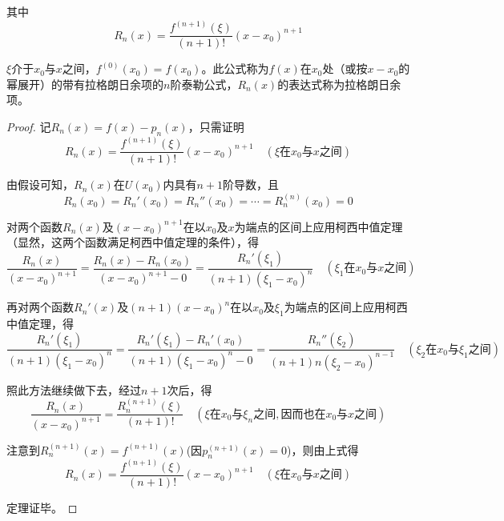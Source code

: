 其中
\begin{equation}
    R_n(x) = \dfrac{f^{(n+1)}(\xi)}{(n+1)!}(x-x_0)^{n+1}
    \nonumber
\end{equation}

$\xi$介于$x_0$与$x$之间，$f^{(0)}(x_0)=f(x_0)$。此公式称为$f(x)$在$x_0$处（或按$x-x_0$的幂展开）的带有拉格朗日余项的$n$阶泰勒公式，$R_n(x)$的表达式称为拉格朗日余项。

\begin{proof}
    记$R_n(x)=f(x)-p_n(x)$，只需证明
    \begin{equation}
        R_n(x) = \dfrac{f^{(n+1)}(\xi)}{(n+1)!}(x-x_0)^{n+1} \quad (\xi\mbox{在}x_0\mbox{与}x\mbox{之间})
        \nonumber
    \end{equation}

    由假设可知，$R_n(x)$在$U(x_0)$内具有$n+1$阶导数，且
    \begin{equation}
        R_n(x_0)=R_n'(x_0)=R_n''(x_0)=\cdots=R_n^{(n)}(x_0)=0
        \nonumber
    \end{equation}

    对两个函数$R_n(x)$及$(x-x_0)^{n+1}$在以$x_0$及$x$为端点的区间上应用柯西中值定理（显然，这两个函数满足柯西中值定理的条件），得
    \begin{equation}
        \dfrac{R_n(x)}{(x-x_0)^{n+1}}=\dfrac{R_n(x)-R_n(x_0)}{(x-x_0)^{n+1}-0}=
        \dfrac{R_n'(\xi_1)}{(n+1)(\xi_1-x_0)^n} \quad (\xi_1\mbox{在}x_0\mbox{与}x\mbox{之间})
        \nonumber
    \end{equation}

    再对两个函数$R_n'(x)$及$(n+1)(x-x_0)^n$在以$x_0$及$\xi_1$为端点的区间上应用柯西中值定理，得
    \begin{equation}
        \dfrac{R_n'(\xi_1)}{(n+1)(\xi_1-x_0)^n}=\dfrac{R_n'(\xi_1)-R_n'(x_0)}{(n+1)(\xi_1-x_0)^n -0}=
        \dfrac{R_n''(\xi_2)}{(n+1)n(\xi_2-x_0)^{n-1}} \quad (\xi_2\mbox{在}x_0\mbox{与}\xi_1\mbox{之间})
        \nonumber
    \end{equation}

    照此方法继续做下去，经过$n+1$次后，得
    \begin{equation}
        \dfrac{R_n(x)}{(x-x_0)^{n+1}}=\dfrac{R_n^{(n+1)}(\xi)}{(n+1)!} \quad 
        (\xi\mbox{在}x_0\mbox{与}\xi_n\mbox{之间},\mbox{因而也在}x_0\mbox{与}x\mbox{之间})
        \nonumber
    \end{equation}

    注意到$R_n^{(n+1)}(x)=f^{(n+1)}(x)$(因$p_n^{(n+1)}(x)=0$)，则由上式得
    \begin{equation}
        R_n(x)=\dfrac{f^{(n+1)}(\xi)}{(n+1)!}(x-x_0)^{n+1} \quad (\xi\mbox{在}x_0\mbox{与}x\mbox{之间})
        \nonumber
    \end{equation}

    定理证毕。
\end{proof}

